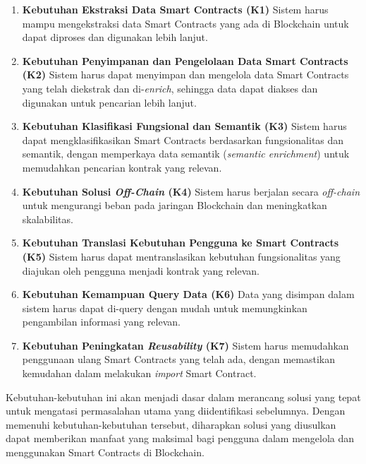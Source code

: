 \begin{enumerate}
  \item \textbf{Kebutuhan Ekstraksi Data Smart Contracts (K1)} \newline
  Sistem harus mampu mengekstraksi data Smart Contracts yang ada di Blockchain untuk dapat diproses dan digunakan lebih lanjut.

  \item \textbf{Kebutuhan Penyimpanan dan Pengelolaan Data Smart Contracts (K2)} \newline
  Sistem harus dapat menyimpan dan mengelola data Smart Contracts yang telah diekstrak dan di-\textit{enrich}, sehingga data dapat diakses dan digunakan untuk pencarian lebih lanjut. 

  \item \textbf{Kebutuhan Klasifikasi Fungsional dan Semantik (K3)} \newline
  Sistem harus dapat mengklasifikasikan Smart Contracts berdasarkan fungsionalitas dan semantik, dengan memperkaya data semantik (\textit{semantic enrichment}) untuk memudahkan pencarian kontrak yang relevan.

  \item \textbf{Kebutuhan Solusi \textit{Off-Chain} (K4)} \newline
  Sistem harus berjalan secara \textit{off-chain} untuk mengurangi beban pada jaringan Blockchain dan meningkatkan skalabilitas. 

  \item \textbf{Kebutuhan Translasi Kebutuhan Pengguna ke Smart Contracts (K5)} \newline
  Sistem harus dapat mentranslasikan kebutuhan fungsionalitas yang diajukan oleh pengguna menjadi kontrak yang relevan.

  \item \textbf{Kebutuhan Kemampuan Query Data (K6)} \newline
  Data yang disimpan dalam sistem harus dapat di-query dengan mudah untuk memungkinkan pengambilan informasi yang relevan.

  \item \textbf{Kebutuhan Peningkatan \textit{Reusability} (K7)} \newline
  Sistem harus memudahkan penggunaan ulang Smart Contracts yang telah ada, dengan memastikan kemudahan dalam melakukan \textit{import} Smart Contract.
\end{enumerate}

Kebutuhan-kebutuhan ini akan menjadi dasar dalam merancang solusi yang tepat untuk mengatasi permasalahan utama yang diidentifikasi sebelumnya. Dengan memenuhi kebutuhan-kebutuhan tersebut, diharapkan solusi yang diusulkan dapat memberikan manfaat yang maksimal bagi pengguna dalam mengelola dan menggunakan Smart Contracts di Blockchain.

